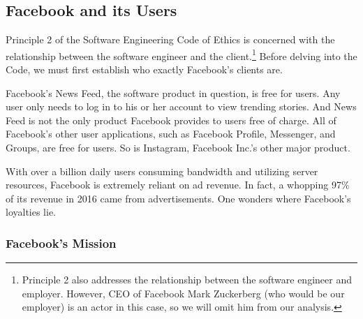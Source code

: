 
\subsection{Facebook and its Users}

\par Principle 2 of the Software Engineering Code of Ethics is concerned with the relationship between the software engineer and the client.\footnote{Principle 2 also addresses the relationship between the software engineer and employer. However, CEO of Facebook Mark Zuckerberg (who would be our employer) is an actor in this case, so we will omit him from our analysis.} \cite{se_code} Before delving into the Code, we must first establish who exactly Facebook's clients are.
\par Facebook's News Feed, the software product in question, is free for users. Any user only needs to log in to his or her account to view trending stories. And News Feed is not the only product Facebook provides to users free of charge. All of Facebook's other user applications, such as Facebook Profile, Messenger, and Groups, are free for users. So is Instagram, Facebook Inc.'s other major product. \cite{fb_newsroom}
\par With over a billion daily users consuming bandwidth and utilizing server resources, Facebook is extremely reliant on ad revenue. In fact, a whopping 97\% of its revenue in 2016 came from advertisements. \cite{fb_4q2016} One wonders where Facebook's loyalties lie.

\subsubsection{Facebook's Mission}
\label{mission}


